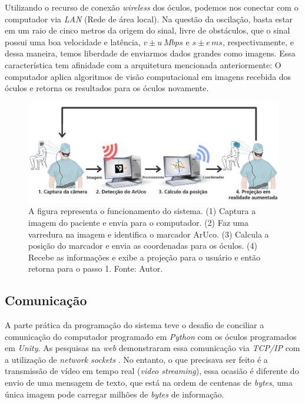 Utilizando o recurso de conexão \textit{wireless} dos óculos, podemos nos conectar com o computador via \textit{LAN} (Rede de área local). Na questão da oscilação, basta estar em um raio de cinco metros da origem do sinal, livre de obstáculos, que o sinal possui uma boa velocidade e latência, \(v \pm u \, Mbps\) e  \(s \pm e \, ms\), respectivamente, e dessa maneira, temos liberdade de enviarmos dados grandes como imagens. Essa característica tem afinidade com a arquitetura mencionada anteriormente: O computador aplica algoritmos de visão computacional em imagens recebida dos óculos e retorna os resultados para os óculos novamente.

\begin{figure}[ht]
    \centering
    \includegraphics[width=.9\linewidth]{figuras/System schematic.png}
    \caption{A figura representa o funcionamento do sistema. (1) Captura a imagem do paciente e envia para o computador. (2) Faz uma varredura na imagem e identifica o marcador ArUco. (3) Calcula a posição do marcador e envia as coordenadas para os óculos. (4) Recebe as informações e exibe a projeção para o usuário e então retorna para o passo 1. Fonte: Autor.}
    \label{fig:arc}
\end{figure}

\subsection{Comunicação}

A parte prática da programação do sistema teve o desafio de conciliar a comunicação do computador programado em \textit{Python} com os óculos programados em \textit{Unity}. As pesquisas na \textit{web} demonstraram essa comunicação via \textit{TCP/IP} com a utilização de \textit{network sockets} \cite{socket-tutorial}. No entanto, o que precisava ser feito é a transmissão de vídeo em tempo real (\textit{video streaming}), essa ocasião é diferente do envio de uma mensagem de texto, que está na ordem de centenas de \textit{bytes}, uma única imagem pode carregar milhões de \textit{bytes} de informação.

